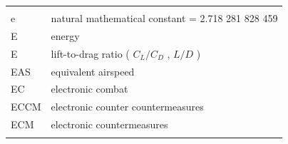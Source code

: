 \documentclass[
]{book}
\begin{document}
\begin{longtable}[]{@{}ll@{}}
\begin{minipage}[t]{0.47\columnwidth}
\end{minipage}\tabularnewline
\begin{minipage}[t]{0.47\columnwidth}\raggedright
\(\mathrm{e}\)\strut
\end{minipage} & \begin{minipage}[t]{0.47\columnwidth}\raggedright
natural mathematical constant = 2.718 281 828 459\strut
\end{minipage}\tabularnewline
\begin{minipage}[t]{0.47\columnwidth}\raggedright
E\strut
\end{minipage} & \begin{minipage}[t]{0.47\columnwidth}\raggedright
energy\strut
\end{minipage}\tabularnewline
\begin{minipage}[t]{0.47\columnwidth}\raggedright
E\strut
\end{minipage} & \begin{minipage}[t]{0.47\columnwidth}\raggedright
lift-to-drag ratio ( \(C_L / C_D\) , \(L/D\) )\strut
\end{minipage}\tabularnewline
\begin{minipage}[t]{0.47\columnwidth}\raggedright
EAS\strut
\end{minipage} & \begin{minipage}[t]{0.47\columnwidth}\raggedright
equivalent airspeed\strut
\end{minipage}\tabularnewline
\begin{minipage}[t]{0.47\columnwidth}\raggedright
EC\strut
\end{minipage} & \begin{minipage}[t]{0.47\columnwidth}\raggedright
electronic combat\strut
\end{minipage}\tabularnewline
\begin{minipage}[t]{0.47\columnwidth}\raggedright
ECCM\strut
\end{minipage} & \begin{minipage}[t]{0.47\columnwidth}\raggedright
electronic counter countermeasures\strut
\end{minipage}\tabularnewline
\begin{minipage}[t]{0.47\columnwidth}\raggedright
ECM\strut
\end{minipage} & \begin{minipage}[t]{0.47\columnwidth}\raggedright
electronic countermeasures\strut
\end{minipage}\tabularnewline
\begin{minipage}[t]{0.47\columnwidth}\raggedright

\end{minipage}
\end{longtable}
\end{document}

